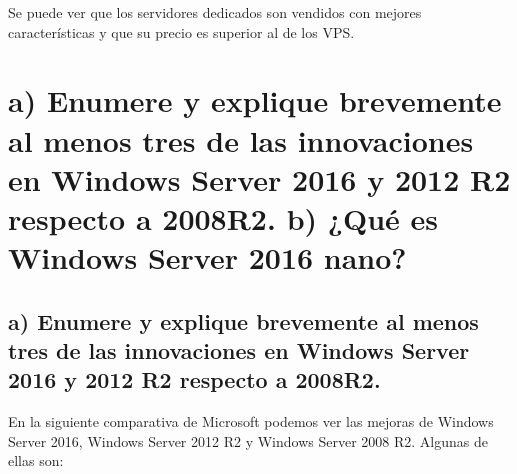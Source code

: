 	Se puede ver que los servidores dedicados son vendidos con mejores características y que su precio es superior al de los VPS.
	
	
	
	\section{a) Enumere y explique brevemente al menos tres de las innovaciones en Windows Server 2016 y 2012 R2 respecto a 2008R2. b) ¿Qué es Windows Server 2016 nano?}
	
	
	\subsection{a) Enumere y explique brevemente al menos tres de las innovaciones en Windows Server 2016 y 2012 R2 respecto a 2008R2.}
	
	En la siguiente comparativa de Microsoft\cite{segundo} podemos ver las mejoras de Windows Server 2016, Windows Server 2012 R2 y Windows Server 2008 R2. Algunas de ellas son:
	
